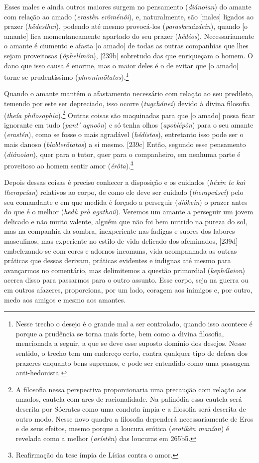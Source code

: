 Esses males e ainda outros maiores surgem no pensamento
(\emph{diánoian}) do amante com relação ao amado (\emph{erastḕn
erôménôi}), e, naturalmente, são {[}males{]} ligados ao prazer
(\emph{hḗdesthai}), podendo até mesmo provocá-los
(\emph{paraskeuázdein}), quando {[}o amante{]} fica momentaneamente
apartado do seu prazer (\emph{hêdéos}). Necessariamente o amante é
ciumento e afasta {[}o amado{]} de todas as outras companhias que lhes
sejam proveitosas (\emph{ôphelímôn}), {[}239b{]} sobretudo das que
enriqueçam o homem. O dano que isso causa é enorme, mas o maior deles é
o de evitar que {[}o amado{]} torne-se prudentíssimo
(\emph{phronimṓtatos}).\footnote{Nesse trecho o desejo é o grande mal a
  ser controlado, quando isso acontece é porque a prudência se torna
  mais forte, bem como a divina filosofia, mencionada a seguir, a que se
  deve esse suposto domínio dos desejos. Nesse sentido, o trecho tem um
  endereço certo, contra qualquer tipo de defesa dos prazeres enquanto
  bens supremos, e pode ser entendido como uma passagem anti-hedonista.}

Quando o amante mantém o afastamento necessário com relação ao seu
predileto, temendo por este ser depreciado, isso ocorre
(\emph{tugchánei}) devido à divina filosofia (\emph{theía
philosophía}).\footnote{A filosofia nessa perspectiva proporcionaria uma
  precaução com relação aos amados, cautela com ares de racionalidade.
  Na palinódia essa cautela será descrita por Sócrates como uma conduta
  ímpia e a filosofia será descrita de outro modo. Nesse novo quadro a
  filosofia dependerá necessariamente de Eros e de seus efeitos, mesmo
  porque a loucura erótica (\emph{erotikèn manían}) é revelada como a
  melhor (\emph{arístên}) das loucuras em 265b5.} Outras coisas são
maquinadas para que {[}o amado{]} possa ficar ignorante em tudo
(\emph{pant' agnoôn}) e só tenha olhos (\emph{apoblépôn}) para o seu
amante (\emph{erastén}), como se fosse o mais agradável
(\emph{hédistos}), entretanto isso pode ser o mais danoso
(\emph{blablerṓtatos}) a si mesmo. {[}239c{]} Então, segundo esse
pensamento (\emph{diánoian}), quer para o tutor, quer para o
companheiro, em nenhuma parte é proveitoso ao homem sentir amor
(\emph{érôta}).\footnote{Reafirmação da tese ímpia de Lísias contra o
  amor.}

Depois dessas coisas é preciso conhecer a disposição e os cuidados
(\emph{héxin te kaì therapeían}) relativos ao corpo, de como ele deve
ser cuidado (\emph{therapeúsei}) pelo seu comandante e em que medida é
forçado a perseguir (\emph{diókein}) o prazer antes do que é o melhor
(\emph{hedù prò agathoû}). Veremos um amante a perseguir um jovem
delicado e não muito valente, alguém que não foi bem nutrido na pureza
do sol, mas na companhia da sombra, inexperiente nas fadigas e suores
dos labores masculinos, mas experiente no estilo de vida delicado dos
afeminados, {[}239d{]} embelezando-se com cores e adornos incomuns, vida
acompanhada as outras práticas que dessas derivam, práticas evidentes e
indignas até mesmo para avançarmos no comentário, mas delimitemos a
questão primordial (\emph{kephálaion}) acerca disso para passarmos para
o outro assunto. Esse corpo, seja na guerra ou em outros afazeres,
proporciona, por um lado, coragem aos inimigos e, por outro, medo aos
amigos e mesmo aos amantes.

